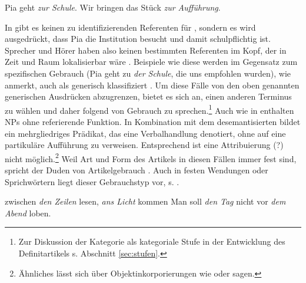 \begin{exe}
	\ex \label{ex:nonref}   
	\begin{xlist}
		\ex \label{ex:schule-pia} Pia geht \textit{zur Schule}. 
		\ex \label{ex:fvg} Wir bringen das Stück \textit{zur Aufführung}.
		\end{xlist}
\end{exe}
\noindent 
In  gibt es keinen zu identifizierenden Referenten für , sondern es wird ausgedrückt, dass Pia die Institution  besucht und damit schulpflichtig ist. Sprecher und Hörer haben also keinen bestimmten Referenten im Kopf, der in Zeit und Raum lokalisierbar wäre \parencite[40]{Bisle-Muller1991}. Beispiele wie diese werden im Gegensatz zum spezifischen  Gebrauch (Pia geht zu \textit{der Schule}, die uns empfohlen wurden), wie \textcite[245]{Studler2011} anmerkt, auch als generisch  klassifiziert \parencite[ähnlich][90]{Szczepaniak2011a}. Um diese Fälle von den oben genannten generischen  Ausdrücken abzugrenzen, bietet es sich an, einen anderen Terminus zu wählen und daher \textcite[54]{Bisle-Muller1991} folgend von  Gebrauch zu sprechen.\footnote{Zur Diskussion der Kategorie  als kategoriale Stufe in der Entwicklung des Definitartikels s. Abschnitt \ref{sec:stufen}.} Auch  wie in  enthalten NPs  ohne referierende Funktion. In Kombination mit dem desemantisierten  bildet  ein mehrgliedriges Prädikat, das eine Verbalhandlung denotiert, ohne auf eine partikuläre Aufführung zu verweisen. Entsprechend ist eine Attribuierung (?) nicht möglich.\footnote{Ähnliches lässt sich über Objektinkorporierungen  wie  oder  sagen.} Weil Art und Form des Artikels in diesen Fällen immer fest sind, spricht der Duden von  Artikelgebrauch \parencite[297--298]{Duden2009}. Auch in festen Wendungen oder Sprichwörtern liegt dieser Gebrauchstyp vor, s. .   

\begin{exe}
	\ex \label{ex:sprichwort}   
	\begin{xlist}
		\ex \label{ex:zeilen} zwischen \textit{den Zeilen} lesen, \textit{ans Licht} kommen 
		\ex \label{ex:fest} Man soll \textit{den Tag} nicht vor \textit{dem Abend} loben. 
		\end{xlist}
\end{exe}

